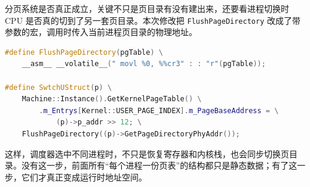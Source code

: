 分页系统是否真正成立，关键不只是页目录有没有建出来，还要看进程切换时 CPU 是否真的切到了另一套页目录。本次修改把 \texttt{FlushPageDirectory} 改成了带参数的宏，调用时传入当前进程页目录的物理地址。

\begin{lstlisting}[language=C++,caption={动态刷新 CR3},label={lst:flush-cr3}]
#define FlushPageDirectory(pgTable) \
    __asm__ __volatile__(" movl %0, %%cr3" : : "r"(pgTable));

#define SwtchUStruct(p) \
    Machine::Instance().GetKernelPageTable() \
        .m_Entrys[Kernel::USER_PAGE_INDEX].m_PageBaseAddress = \
            (p)->p_addr >> 12; \
    FlushPageDirectory((p)->GetPageDirectoryPhyAddr());
\end{lstlisting}

这样，调度器选中不同进程时，不只是恢复寄存器和内核栈，也会同步切换页目录。没有这一步，前面所有“每个进程一份页表”的结构都只是静态数据；有了这一步，它们才真正变成运行时地址空间。

